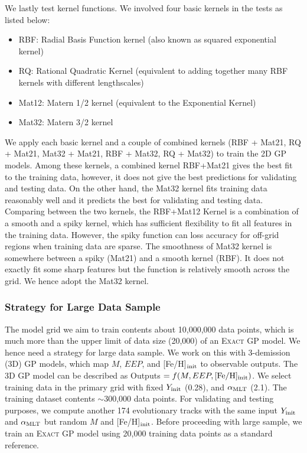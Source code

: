 We lastly test kernel functions. We involved four basic kernels in the tests as listed below:
\begin{itemize}
\item RBF: Radial Basis Function kernel (also known as squared exponential kernel)
\item RQ: Rational Quadratic Kernel (equivalent to adding together many RBF kernels with different lengthscales)
\item Mat12: Matern 1/2 kernel (equivalent to the Exponential Kernel)
\item Mat32: Matern 3/2 kernel 
\end{itemize}
We apply each basic kernel and a couple of combined kernels (RBF + Mat21, RQ + Mat21, Mat32 + Mat21, RBF + Mat32, RQ + Mat32) to train the 2D GP models. Among these kernels, a combined kernel RBF+Mat21 gives the best fit to the training data, however, it does not give the best predictions for validating and testing data. On the other hand, the Mat32 kernel fits training data reasonably well and it predicts the best for validating and testing data. 
%
Comparing between the two kernels, the RBF+Mat12 Kernel is a combination of a smooth and a spiky kernel, which has sufficient flexibility to fit all features in the training data. However, the spiky function can loss accuracy for off-grid regions when training data are sparse. 
%
The smoothness of Mat32 kernel is somewhere between a spiky (Mat21) and a smooth kernel (RBF). It does not exactly fit some sharp features but the function is relatively smooth across the grid. We hence adopt the Mat32 kernel.  

 \subsubsection{Strategy for Large Data Sample}

The model grid we aim to train contents about 10,000,000 data points, which is much more than the upper limit of data size (20,000) of an \textsc{Exact GP} model. We hence need a strategy for large data sample. We work on this with 3-demission (3D) GP models, which map $M$, $EEP$, and  [Fe/H]$_{\rm init}$ to observable outputs. The 3D GP model can be described as Outputs $ = f(M, EEP, {\rm [Fe/H]_{init}})$. 
We select training data in the primary grid with fixed $Y_{\rm init}$ (0.28), and $\alpha_{\rm MLT}$ (2.1). The training dataset contents $\sim$300,000 data points. For validating and testing purposes, we compute another 174 evolutionary tracks with the same input $Y_{\rm init}$ and $\alpha_{\rm MLT}$ but random $M$ and [Fe/H]$_{\rm init}$. Before proceeding with large sample, we train an \textsc{Exact GP} model using 20,000 training data points as a standard reference. 

